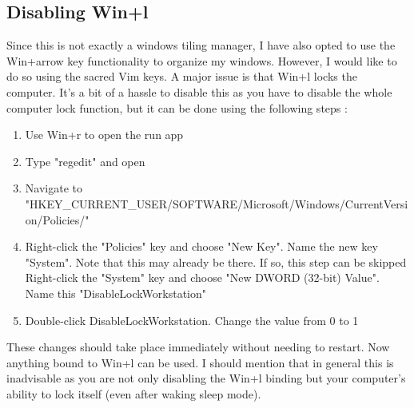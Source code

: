 \subsection{Disabling Win+l}
Since this is not exactly a windows tiling manager, I have also opted to use the
Win+arrow key functionality to organize my windows. However, I would like to do
so using the sacred Vim keys. A major issue is that Win+l locks the computer.
It's a bit of a hassle to disable this as you have to disable the whole computer
lock function, but it can be done using the following steps \cite{glenn2016disable}:
\begin{enumerate}
    \item Use Win+r to open the run app
    \item Type "regedit" and open
    \item Navigate to "HKEY\_CURRENT\_USER/SOFTWARE/Microsoft/Windows/CurrentVersion/Policies/"
    \item Right-click the "Policies" key and choose "New \trangle Key". Name the new
        key "System". Note that this may already be there. If so, this step can
        be skipped Right-click the "System" key and choose "New \trangle DWORD (32-bit)
        Value". Name this "DisableLockWorkstation"
    \item Double-click DisableLockWorkstation. Change the value from 0 to 1
\end{enumerate}
These changes should take place immediately without needing to restart. Now
anything bound to Win+l can be used. I should mention that in general this is
inadvisable as you are not only disabling the Win+l binding but your computer's
ability to lock itself (even after waking sleep mode).
